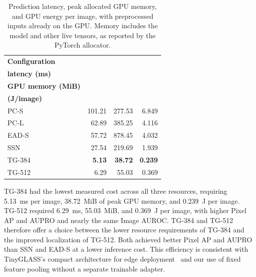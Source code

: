 \begin{table}[ht!]
    \centering
    \small
    \setlength{\tabcolsep}{6pt}
    \begin{tabular}{@{}l r r r@{}}
        \toprule
        \textbf{Configuration}                                          &
        \shortstack{\textbf{Prediction}\\\textbf{latency (ms)}}         &
        \shortstack{\textbf{Peak allocated}\\\textbf{GPU memory (MiB)}} &
        \shortstack{\textbf{Energy}\\\textbf{(J/image)}}                                                                  \\
        \midrule
        \midrule
        PC-S                                                            & 101.21        & 277.53         & 6.849          \\
        PC-L                                                            & 62.89         & 385.25         & 4.116          \\
        EAD-S                                                           & 57.72         & 878.45         & 4.032          \\
        SSN                                                             & 27.54         & 219.69         & 1.939          \\
        TG-384                                                          & \textbf{5.13} & \textbf{38.72} & \textbf{0.239} \\
        TG-512                                                          & 6.29          & 55.03          & 0.369          \\
        \bottomrule
    \end{tabular}
    \vspace{5mm}
    \caption{Prediction latency, peak allocated GPU memory, and GPU energy per image, with preprocessed inputs already on the GPU. Memory includes the model and other live tensors, as reported by the PyTorch allocator.}
    \label{tab:damage-reference-efficiency}
\end{table}

TG-384 had the lowest measured cost across all three resources, requiring 5.13~ms per image, 38.72~MiB of peak GPU memory, and 0.239~J per image. TG-512 required 6.29~ms, 55.03~MiB, and 0.369~J per image, with higher Pixel AP and AUPRO and nearly the same Image AUROC. TG-384 and TG-512 therefore offer a choice between the lower resource requirements of TG-384 and the improved localization of TG-512. Both achieved better Pixel AP and AUPRO than SSN and EAD-S at a lower inference cost. This efficiency is consistent with TinyGLASS's compact architecture for edge deployment~\cite{bonazzi2026tinyglass} and our use of fixed feature pooling without a separate trainable adapter.


